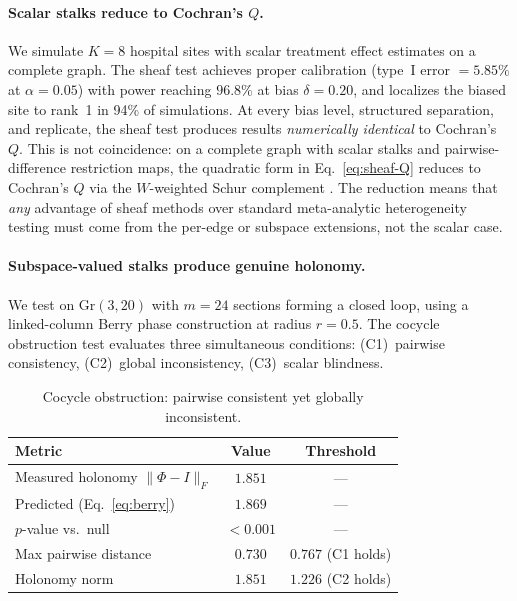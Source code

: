 \documentclass[11pt]{article}
\newcommand{\Gr}{\mathrm{Gr}}
\begin{document}
\paragraph{Scalar stalks reduce to Cochran's $Q$.}
We simulate $K = 8$ hospital sites with scalar treatment effect estimates on a complete graph.
The sheaf test achieves proper calibration (type~I error $= 5.85\%$ at $\alpha = 0.05$) with power reaching $96.8\%$ at bias $\delta = 0.20$, and localizes the biased site to rank~1 in 94\% of simulations.
At every bias level, structured separation, and replicate, the sheaf test produces results \emph{numerically identical} to Cochran's $Q$.
This is not coincidence: on a complete graph with scalar stalks and pairwise-difference restriction maps, the quadratic form in Eq.~\eqref{eq:sheaf-Q} reduces to Cochran's $Q$ via the $W$-weighted Schur complement \citep[Appendix~C]{tower2026sheaf}.
The reduction means that \emph{any} advantage of sheaf methods over standard meta-analytic heterogeneity testing must come from the per-edge or subspace extensions, not the scalar case.

\paragraph{Subspace-valued stalks produce genuine holonomy.}
We test on $\Gr(3, 20)$ with $m = 24$ sections forming a closed loop, using a linked-column Berry phase construction at radius $r = 0.5$.
The cocycle obstruction test evaluates three simultaneous conditions: (C1)~pairwise consistency, (C2)~global inconsistency, (C3)~scalar blindness.

\begin{table}[t]
\centering
\caption{Cocycle obstruction: pairwise consistent yet globally inconsistent.}
\label{tab:cocycle}
\small
\begin{tabular}{@{}lcc@{}}
\toprule
\textbf{Metric} & \textbf{Value} & \textbf{Threshold} \\
\midrule
Measured holonomy $\|\Phi - I\|_F$ & $1.851$ & --- \\
Predicted (Eq.~\ref{eq:berry}) & $1.869$ & --- \\
$p$-value vs.\ null & $< 0.001$ & --- \\
\midrule
Max pairwise distance & $0.730$ & $0.767$ (C1 holds) \\
Holonomy norm & $1.851$ & $1.226$ (C2 holds) \\
\bottomrule
\end{tabular}
\end{table}
\end{document}

